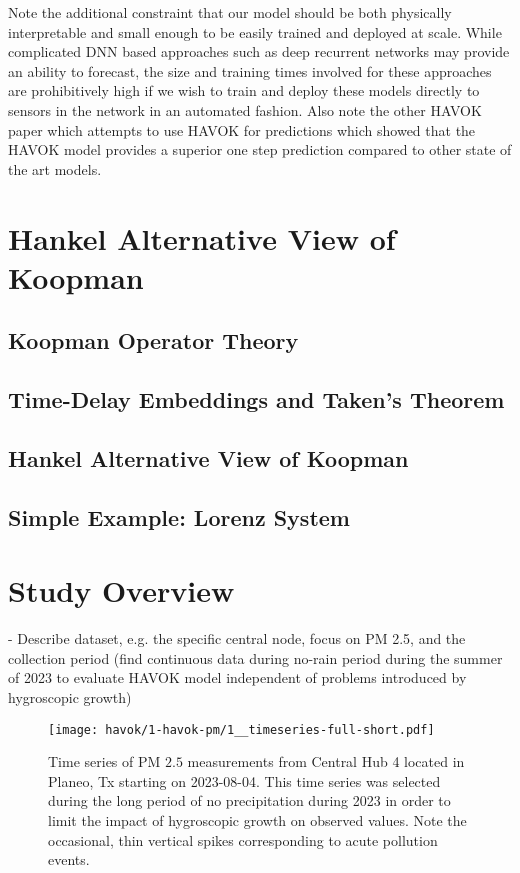 Note the additional constraint that our model should be both physically
interpretable and small enough to be easily trained and deployed at scale. While
complicated DNN based approaches such as deep recurrent networks may provide an
ability to forecast, the size and training times involved for these approaches
are prohibitively high if we wish to train and deploy these models directly to
sensors in the network in an automated fashion. Also note the other HAVOK paper
which attempts to use HAVOK for predictions which showed that the HAVOK model
provides a superior one step prediction compared to other state of the art
models.


\section{Hankel Alternative View of Koopman}


\subsection{Koopman Operator Theory}

\subsection{Time-Delay Embeddings and Taken's Theorem}

\subsection{Hankel Alternative View of Koopman}


\subsection{Simple Example: Lorenz System}


\section{Study Overview}

- Describe dataset, e.g. the specific central node, focus on PM 2.5, and the
collection period (find continuous data during no-rain period during the summer
of 2023 to evaluate HAVOK model independent of problems introduced by
hygroscopic growth)


\begin{figure}[h]
  \centering
  \texttt{[image: havok/1-havok-pm/1\_\_timeseries-full-short.pdf]}
  \caption{Time series of PM $2.5$ measurements from Central Hub 4 located in
    Planeo, Tx starting on 2023-08-04. This time series was selected during the
    long period of no precipitation during 2023 in order to limit the impact of
    hygroscopic growth on observed values. Note the occasional, thin vertical
    spikes corresponding to acute pollution events.}
  \label{fig:pm-timeseries-orig}
\end{figure}


